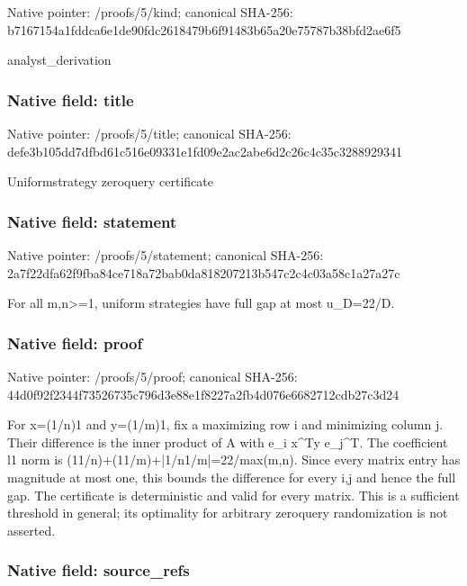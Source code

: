 \documentclass[10pt,a4paper]{article}
\begin{document}
Native pointer: /proofs/5/kind; canonical SHA-256: b7167154a1fddca6e1de90fd\allowbreak{}c2618479b6f91483b65a20e7\allowbreak{}5787b38bfd2ae6f5


analyst\_derivation


\subsubsection{Native field: title}


Native pointer: /proofs/5/title; canonical SHA-256: defe3b105dd7dfbd61c516e0\allowbreak{}9331e1fd09e2ac2abe6d2c26\allowbreak{}c4c35c3288929341


Uniformstrategy zeroquery certificate


\subsubsection{Native field: statement}


Native pointer: /proofs/5/statement; canonical SHA-256: 2a7f22dfa62f9fba84ce718a\allowbreak{}72bab0da818207213b547c2c\allowbreak{}4c03a58c1a27a27c


For all m,n>=1, uniform strategies have full gap at most u\_D=22/D.


\subsubsection{Native field: proof}


Native pointer: /proofs/5/proof; canonical SHA-256: 44d0f92f2344f73526735c79\allowbreak{}6d3e88e1f8227a2fb4d076e6\allowbreak{}682712cdb27c3d24


For x=(1/n)1 and y=(1/m)1, fix a maximizing row i and minimizing column j. Their difference is the inner product of A with e\_i x\textasciicircum{}Ty e\_j\textasciicircum{}T. The coefficient l1 norm is (11/n)+(11/m)+|1/n1/m|=22/max(m,n). Since every matrix entry has magnitude at most one, this bounds the difference for every i,j and hence the full gap. The certificate is deterministic and valid for every matrix. This is a sufficient threshold in general; its optimality for arbitrary zeroquery randomization is not asserted.


\subsubsection{Native field: source\_refs}
\end{document}
